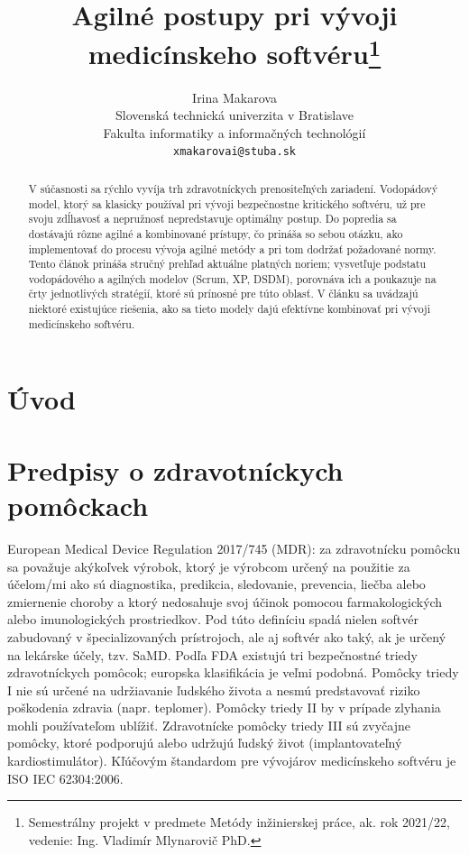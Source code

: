 \documentclass[10pt,twoside,slovak,a4paper]{article}
\title{Agilné postupy pri vývoji medicínskeho softvéru\thanks{Semestrálny projekt v predmete Metódy inžinierskej práce, ak. rok 2021/22, vedenie: Ing. Vladimír Mlynarovič PhD.}}
\author{Irina Makarova\\[2pt]
	{\small Slovenská technická univerzita v Bratislave}\\
	{\small Fakulta informatiky a informačných technológií}\\
	{\small \texttt{xmakarovai@stuba.sk}}
	}
\begin{document}
\renewcommand{\abstractname}{\vspace{-\baselineskip}} %
\maketitle

\begin{abstract}
V súčasnosti sa rýchlo vyvíja trh zdravotníckych prenositeľných zariadení. Vodopádový model, ktorý sa klasicky používal pri vývoji bezpečnostne kritického softvéru, už pre svoju zdĺhavosť a nepružnosť nepredstavuje optimálny postup. Do popredia sa dostávajú rôzne agilné a kombinované prístupy, čo prináša so sebou otázku, ako implementovať do procesu vývoja agilné metódy a pri tom dodržať požadované normy. Tento článok prináša stručný prehľad aktuálne platných noriem; vysvetľuje podstatu vodopádového a agilných modelov (Scrum, XP, DSDM), porovnáva ich a poukazuje na črty jednotlivých stratégií, ktoré sú prínosné pre túto oblasť. V článku sa uvádzajú niektoré existujúce riešenia, ako sa tieto modely dajú efektívne kombinovať pri vývoji medicínskeho softvéru.
\end{abstract}

\section{Úvod} 

\section{Predpisy o zdravotníckych pomôckach}
European Medical Device Regulation 2017/745 (MDR): za zdravotnícku pomôcku sa považuje akýkoľvek výrobok, ktorý je výrobcom určený na použitie za účelom/mi ako sú diagnostika, predikcia, sledovanie, prevencia, liečba alebo zmiernenie choroby a ktorý nedosahuje svoj účinok pomocou farmakologických alebo imunologických prostriedkov. Pod túto definíciu spadá nielen softvér zabudovaný v špecializovaných prístrojoch, ale aj softvér ako taký, ak je určený na lekárske účely, tzv. SaMD. Podľa FDA existujú tri bezpečnostné triedy zdravotníckych pomôcok; europska klasifikácia je veľmi podobná. Pomôcky triedy I nie sú určené na udržiavanie ľudského života a nesmú predstavovať riziko poškodenia zdravia (napr. teplomer). Pomôcky triedy II by v prípade zlyhania mohli používateľom ublížiť. Zdravotnícke pomôcky triedy III sú zvyčajne pomôcky, ktoré podporujú alebo udržujú ľudský život (implantovateľný kardiostimulátor).
Kľúčovým štandardom pre vývojárov medicínskeho softvéru je ISO IEC 62304:2006\cite{bronneke2021}.
\end{document}
